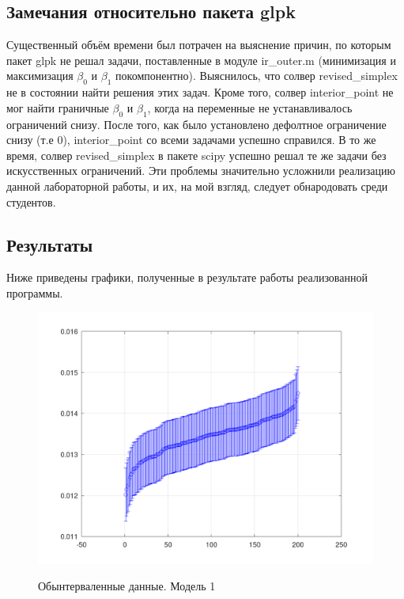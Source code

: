 \subsection{Замечания относительно пакета glpk}

Существенный объём времени был потрачен на выяснение причин, по которым пакет glpk не решал задачи, поставленные в модуле ir\_outer.m (минимизация и максимизация $\beta_0$ и $\beta_1$ покомпонентно). Выяснилось, что солвер revised\_simplex не в состоянии найти решения этих задач. Кроме того, солвер interior\_point не мог найти граничные $\beta_0$ и $\beta_1$, когда на переменные не устанавливалось ограничений снизу. После того, как было установлено дефолтное ограничение снизу (т.е 0), interior\_point со всеми задачами успешно справился. В то же время, солвер revised\_simplex в пакете scipy успешно решал те же задачи без искусственных ограничений. Эти проблемы значительно усложнили реализацию данной лабораторной работы, и их, на мой взгляд, следует обнародовать среди студентов.

\subsection{Результаты}

Ниже приведены графики, полученные в результате работы реализованной программы.

\begin{figure}[H]
	\begin{center}
		\includegraphics[scale=0.29]{interval_problem_1}
		\label{pic:model1}
		\caption{Обынтерваленные данные. Модель 1}
	\end{center}
\end{figure}

